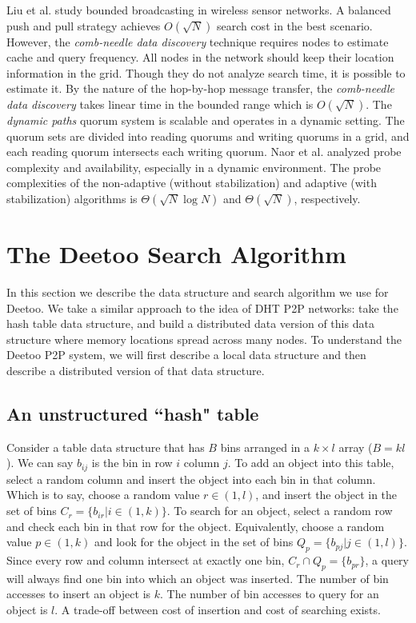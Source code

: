 \documentclass[conference]{IEEEtran}
\begin{document}
Liu et al. \cite{LiuHZ04} study bounded broadcasting in wireless sensor networks. 
A balanced push and pull strategy achieves $O(\sqrt N)$ search 
cost in the best scenario. However, the \emph{comb-needle data discovery} technique 
requires nodes to estimate cache and query frequency.
All nodes in the network should keep their location information in the grid. 
Though they do not analyze search time, it is possible to estimate it. By the
nature of the hop-by-hop message transfer, the \emph{comb-needle data discovery} 
takes linear time in the bounded range which is $O(\sqrt N)$. 
The \emph{dynamic paths} quorum system\cite{Naor05} 
is scalable and operates in a dynamic setting. The quorum sets are 
divided into reading quorums and writing quorums in a grid, and each 
reading quorum intersects each writing quorum. Naor et al. analyzed probe 
complexity and availability, especially in a dynamic environment. 
The probe complexities of the non-adaptive (without stabilization)
and adaptive (with stabilization) algorithms is 
$\Theta(\sqrt N \log N)$ and $\Theta(\sqrt N)$, respectively. 

\section{The Deetoo Search Algorithm}\label{sec:model}
In this section we describe the data structure and search algorithm
we use for Deetoo.  We take a similar approach to the idea of DHT P2P networks: take the hash table
data structure, and build a distributed data version of this data structure
where memory locations spread across many nodes.  
To understand the Deetoo P2P system, we will first describe a local
data structure and then describe a distributed version of that data structure.

\subsection{An unstructured ``hash" table}
\label{sec:localtab}

Consider a table data structure that has $B$ bins arranged in a $k\times l$
array ($B=kl$).  We can say $b_{ij}$ is the bin in row $i$ column $j$.  To add an
object into this table, select a random column and insert the object into each
bin in that column.  Which is to say, choose a random value $r\in (1,l)$,
and insert the object in the set of bins $C_r = \{b_{ir} | i \in (1,k)\}$.
To search for an object, select a random row and check each bin in that
row for the
object.  Equivalently, choose a random value $p \in (1,k)$ and look
for the object in the set of bins $Q_p = \{b_{pj} | j \in (1,l)\}$.  Since
every row and column intersect at exactly one bin, $C_r \cap Q_p = \{b_{pr}\}$,
a query will always find
one bin into which an object was inserted.  The number of bin accesses to
insert an object is $k$.  The number of bin accesses to query for an object is
$l$.  A trade-off between cost of insertion and cost of searching exists.
\end{document}
